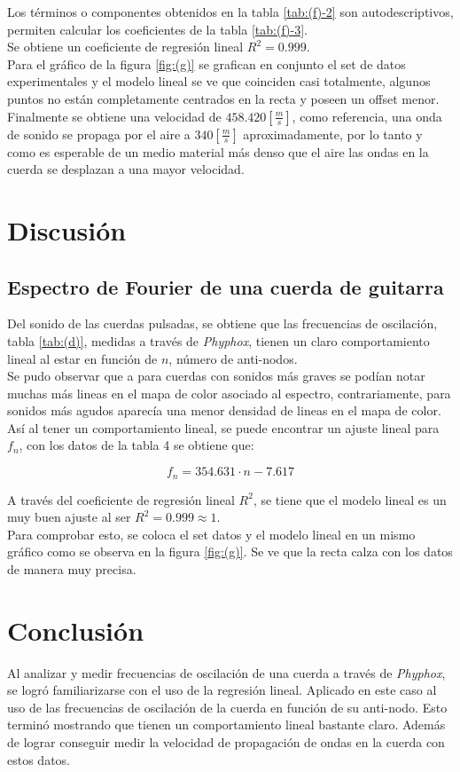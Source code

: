 \documentclass[letterpaper,11pt]{article} %
\begin{document}
Los términos o componentes obtenidos en la tabla \ref{tab:(f)-2} son autodescriptivos, permiten calcular los coeficientes de la tabla \ref{tab:(f)-3}. \\

Se obtiene un coeficiente de regresión lineal $R^2 = 0.999$.\\

Para el gráfico de la figura \ref{fig:(g)} se grafican en conjunto el set de datos experimentales y el modelo lineal se ve que coinciden casi totalmente, algunos puntos no están completamente centrados en la recta y poseen un offset menor. \\

Finalmente se obtiene una velocidad de $458.420 [\frac{m}{s}]$, como referencia, una onda de sonido se propaga por el aire a $340[\frac{m}{s}]$ aproximadamente, por lo tanto y como es esperable de un medio material más denso que el aire las ondas en la cuerda se desplazan a una mayor velocidad. 

\newpage\section{Discusión}
\subsection{Espectro de Fourier de una cuerda de guitarra}
Del sonido de las cuerdas pulsadas, se obtiene que las frecuencias de oscilación, tabla \ref{tab:(d)}, medidas a través de \textit{Phyphox}, tienen un claro comportamiento lineal al estar en función de $n$, número de anti-nodos.\\

Se pudo observar que a para cuerdas con sonidos más graves se podían notar muchas más lineas en el mapa de color asociado al espectro, contrariamente, para sonidos más agudos aparecía una menor densidad de lineas en el mapa de color. \\

Así al tener un comportamiento lineal, se puede encontrar un ajuste lineal para $f_n$, con los datos de la tabla 4 se obtiene que:

$$f_n=354.631\cdot n-7.617$$

A través del coeficiente de regresión lineal $R^2$, se tiene que el modelo lineal es un muy buen ajuste al ser $R^2=0.999\approx 1$. \\

Para comprobar esto, se coloca el set datos y el modelo lineal en un mismo gráfico como se observa en la figura \ref{fig:(g)}. Se ve que la recta calza con los datos de manera muy precisa.


\newpage \section{Conclusión}
Al analizar y medir frecuencias de oscilación de una cuerda a través de \textit{Phyphox}, se logró familiarizarse con el uso de la regresión lineal. Aplicado en este caso al uso de las frecuencias de oscilación de la cuerda en función de su anti-nodo. Esto terminó mostrando que tienen un comportamiento lineal bastante claro. Además de lograr conseguir medir la velocidad de propagación de ondas en la cuerda con estos datos.
\end{document}
